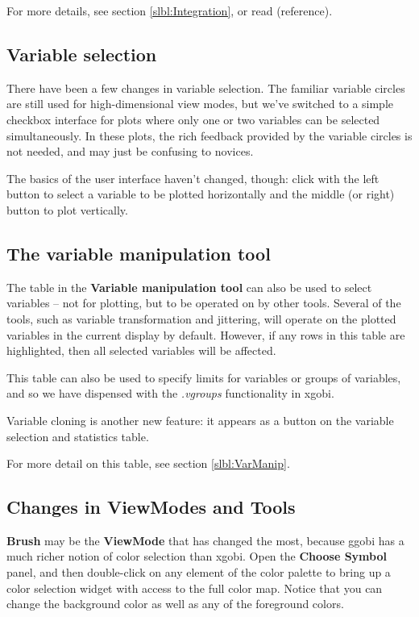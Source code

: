 \documentclass[11pt]{article}
\begin{document}
For more details, see section \ref{slbl:Integration}, or read
(reference).

\subsection {Variable selection}

There have been a few changes in variable selection.  The
familiar variable circles are still used for high-dimensional
view modes, but we've switched to a simple checkbox interface
for plots where only one or two variables can be selected
simultaneously.  In these plots, the rich feedback provided
by the variable circles is not needed, and may just be confusing
to novices.

The basics of the user interface haven't changed, though:
click with the left button to select a variable to be plotted
horizontally and the middle (or right) button to plot vertically.

\subsection {The variable manipulation tool}

The table in the {\bf Variable manipulation tool} can also be used to
select variables -- not for plotting, but to be operated on by other
tools.  Several of the tools, such as variable transformation and
jittering, will operate on the plotted variables in the current
display by default.  However, if any rows in this table are
highlighted, then all selected variables will be affected.

This table can also be used to specify limits for variables or groups
of variables, and so we have dispensed with the {\em .vgroups}
functionality in xgobi.

Variable cloning is another new feature: it appears as a button
on the variable selection and statistics table.

For more detail on this table, see section \ref{slbl:VarManip}.

\subsection{Changes in ViewModes and Tools}

{\bf Brush} may be the {\bf ViewMode} that has changed the most,
because ggobi has a much richer notion of color selection than
xgobi.  Open the {\bf Choose Symbol} panel, and then double-click on
any element of the color palette to bring up a color selection widget
with access to the full color map.  Notice that you can change the
background color as well as any of the foreground colors.
\end{document}

